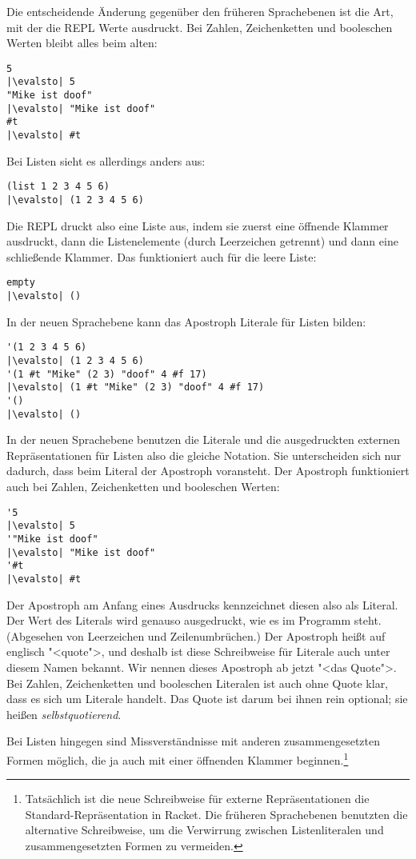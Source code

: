 Die entscheidende Änderung gegenüber den früheren Sprachebenen ist
die Art, mit der die REPL Werte ausdruckt.  Bei Zahlen, Zeichenketten
und booleschen Werten bleibt alles beim alten:
%
\begin{lstlisting}
5
|\evalsto| 5
"Mike ist doof"
|\evalsto| "Mike ist doof"
#t
|\evalsto| #t
\end{lstlisting}
%
Bei Listen sieht es allerdings anders aus:
%
\begin{lstlisting}
(list 1 2 3 4 5 6)
|\evalsto| (1 2 3 4 5 6)
\end{lstlisting}
%
Die REPL druckt also eine Liste aus, indem sie zuerst eine öffnende
Klammer ausdruckt, dann die Listenelemente (durch Leerzeichen
getrennt) und dann eine schließende Klammer.
Das funktioniert auch für die leere Liste:
%
\begin{lstlisting}
empty
|\evalsto| ()
\end{lstlisting}
%
In der neuen Sprachebene kann das Apostroph
Literale für Listen bilden:
%
\begin{lstlisting}
'(1 2 3 4 5 6)
|\evalsto| (1 2 3 4 5 6)
'(1 #t "Mike" (2 3) "doof" 4 #f 17)
|\evalsto| (1 #t "Mike" (2 3) "doof" 4 #f 17)
'()
|\evalsto| ()
\end{lstlisting}
%
In der neuen Sprachebene benutzen die Literale und die ausgedruckten
externen Repräsentationen für Listen also die gleiche
Notation.  Sie unterscheiden sich nur dadurch,
dass beim Literal der Apostroph voransteht.  Der Apostroph funktioniert
auch bei Zahlen, Zeichenketten und booleschen Werten:
%
\begin{lstlisting}
'5
|\evalsto| 5
'"Mike ist doof"
|\evalsto| "Mike ist doof"
'#t
|\evalsto| #t
\end{lstlisting}
%
Der Apostroph am Anfang eines Ausdrucks
kennzeichnet diesen also als Literal.  Der Wert des Literals wird 
genauso ausgedruckt, wie es im Programm steht.  (Abgesehen von
Leerzeichen und Zeilenumbrüchen.)  Der Apostroph heißt auf englisch
"<quote">, und deshalb ist diese
Schreibweise für Literale auch unter diesem Namen bekannt.  Wir nennen
dieses Apostroph ab jetzt "<das Quote">. Bei Zahlen,
Zeichenketten und booleschen Literalen ist auch ohne Quote klar, dass
es sich um Literale handelt.  Das Quote ist darum bei ihnen rein
optional; sie heißen \textit{selbstquotierend}.

Bei Listen hingegen sind Missverständnisse mit anderen
zusammengesetzten Formen möglich, die ja auch mit einer öffnenden Klammer
beginnen.\footnote{Tatsächlich ist die neue Schreibweise für externe
  Repräsentationen die Standard-Repräsentation in Racket.  Die
  früheren Sprachebenen benutzten die alternative Schreibweise, um die
  Verwirrung zwischen Listenliteralen und zusammengesetzten Formen zu
  vermeiden.} 

